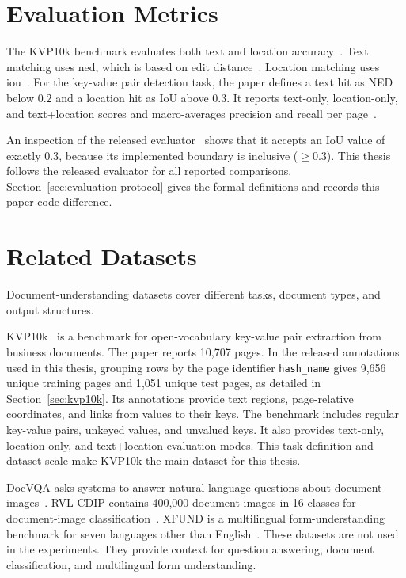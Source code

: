 \section{Evaluation Metrics}
\label{sec:metrics_review}

The KVP10k benchmark evaluates both text and location
accuracy~\cite{kvp10k}. Text matching uses \gls{ned}, which is based on edit
distance~\cite{levenshtein}. Location matching uses
\gls{iou}~\cite{iou}. For the key-value pair detection task, the paper defines
a text hit as NED below $0.2$ and a location hit as IoU above $0.3$. It reports
text-only, location-only, and text+location scores and macro-averages precision
and recall per page~\cite{kvp10k}.

An inspection of the released evaluator~\cite{kvp10k_repository} shows that it
accepts an IoU value of exactly $0.3$, because its implemented boundary is inclusive ($\geq 0.3$).
This thesis follows the released evaluator for all reported comparisons.
Section~\ref{sec:evaluation-protocol} gives the formal definitions and records
this paper-code difference.

\section{Related Datasets}
\label{sec:related_datasets}

Document-understanding datasets cover different tasks, document types, and
output structures.

KVP10k~\cite{kvp10k} is a benchmark for open-vocabulary key-value pair
extraction from business documents. The paper reports 10{,}707 pages. In the
released annotations used in this thesis, grouping rows by the page identifier
\texttt{hash\_name} gives 9{,}656 unique training pages and 1{,}051 unique test
pages, as detailed in Section~\ref{sec:kvp10k}. Its annotations provide text
regions, page-relative coordinates, and links from values to their keys. The
benchmark includes regular key-value pairs, unkeyed values, and unvalued keys.
It also provides text-only, location-only, and text+location evaluation modes.
This task definition and dataset scale make KVP10k the main dataset for this
thesis.

DocVQA asks systems to answer natural-language questions about document
images~\cite{docvqa}. RVL-CDIP contains 400,000 document images in 16 classes
for document-image classification~\cite{rvlcdip}. XFUND is a multilingual
form-understanding benchmark for seven languages other than
English~\cite{xfund}. These datasets are not used in the experiments. They
provide context for question answering, document classification, and
multilingual form understanding.

